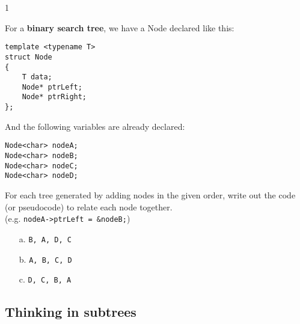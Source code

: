 \documentclass[a4paper,12pt,oneside]{book}
\newcounter{question}
\begin{document}
        \newpage


        \begin{question}{\thequestion}{1}
            
            For a \textbf{binary search tree}, we have a Node declared like this:
                    
\footnotesize 
\begin{verbatim}
template <typename T>
struct Node
{
    T data;
    Node* ptrLeft;
    Node* ptrRight;
};
\end{verbatim}
\normalsize

            And the following variables are already declared:

\begin{verbatim}
Node<char> nodeA;
Node<char> nodeB;
Node<char> nodeC;
Node<char> nodeD;
\end{verbatim}

            For each tree generated by adding nodes in the given order,
            write out the
            code (or pseudocode) to relate each node together. \\
            (e.g. \texttt{nodeA->ptrLeft = \&nodeB;})
            
            \begin{itemize}
                \item[a.]   \texttt{B, A, D, C}
                    \solution{}{ \vspace{3cm} }
                    
                \item[b.]   \texttt{A, B, C, D}
                    \solution{}{ \vspace{3cm} }

                \item[c.]   \texttt{D, C, B, A}
                    \solution{}{ \vspace{3cm} }
                    
            \end{itemize}
            
        \end{question}


    \newpage

    \subsection{Thinking in subtrees}
\end{document}
